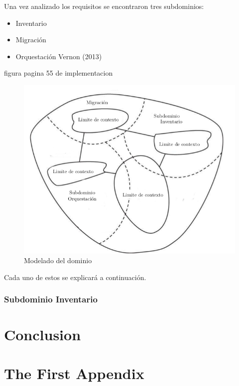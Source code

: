 \documentclass[12pt,twoside]{reedthesis}
\providecommand{\tightlist}{%
  \setlength{\itemsep}{0pt}\setlength{\parskip}{0pt}}
\theoremstyle{definition}
\theoremstyle{definition}
\theoremstyle{definition}
\theoremstyle{remark}
\begin{document}
Una vez analizado los requisitos se encontraron tres subdominios:
\begin{itemize}
\tightlist
\item
  Inventario
\item
  Migración
\item
  Orquestación Vernon (2013)
\end{itemize}
figura pagina 55 de implementacion
\begin{figure}[h!]
  \centering
  \includegraphics[scale=0.5]{./figure/Cap4/plantillaDDD.png}
  \caption{Modelado del dominio}\label{DDDplantilla}
\end{figure}
Cada uno de estos se explicará a continuación.

\hypertarget{subdominio-inventario}{%
\subsection{Subdominio Inventario}\label{subdominio-inventario}}

\hypertarget{conclusion}{%
\chapter*{Conclusion}\label{conclusion}}

\appendix

\hypertarget{the-first-appendix}{%
\chapter{The First Appendix}\label{the-first-appendix}}
\end{document}
